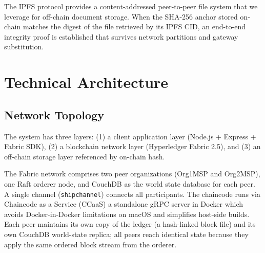 \documentclass[conference]{IEEEtran}
\begin{document}
The IPFS protocol \cite{ipfs} provides a content-addressed peer-to-peer
file system that we leverage for off-chain document storage.  When the
SHA-256 anchor stored on-chain matches the digest of the file retrieved by
its IPFS CID, an end-to-end integrity proof is established that survives
network partitions and gateway substitution.

\section{Technical Architecture}

\subsection{Network Topology}

The system has three layers: (1) a client application layer (Node.js +
Express + Fabric SDK), (2) a blockchain network layer (Hyperledger Fabric
2.5), and (3) an off-chain storage layer referenced by on-chain hash.

The Fabric network comprises two peer organizations (Org1MSP and Org2MSP),
one Raft orderer node, and CouchDB as the world state database for each
peer.  A single channel (\texttt{shipchannel}) connects all participants.
The chaincode runs via Chaincode as a Service (CCaaS)  a standalone gRPC
server in Docker  which avoids Docker-in-Docker limitations on macOS
and simplifies host-side builds.  Each peer maintains its own copy of the
ledger (a hash-linked block file) and its own CouchDB world-state replica;
all peers reach identical state because they apply the same ordered block
stream from the orderer.
\end{document}
